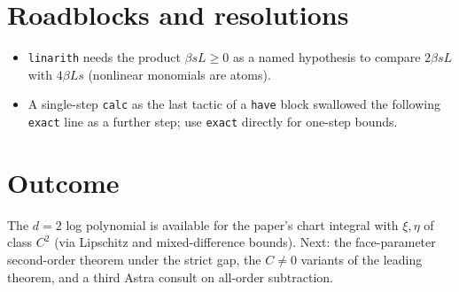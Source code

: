 \documentclass[11pt]{article}
\begin{document}
\section{Roadblocks and resolutions}
\begin{itemize}
\item \texttt{linarith} needs the product $\beta sL\ge0$ as a named hypothesis to compare
$2\beta sL$ with $4\beta Ls$ (nonlinear monomials are atoms).
\item A single-step \texttt{calc} as the last tactic of a \texttt{have} block swallowed the following
\texttt{exact} line as a further step; use \texttt{exact} directly for one-step bounds.
\end{itemize}

\section{Outcome}
The $d=2$ log polynomial is available for the paper's chart integral with $\xi,\eta$ of class $C^2$
(via Lipschitz and mixed-difference bounds). Next: the face-parameter second-order theorem under the
strict gap, the $C\ne0$ variants of the leading theorem, and a third Astra consult on all-order
subtraction.
\end{document}
